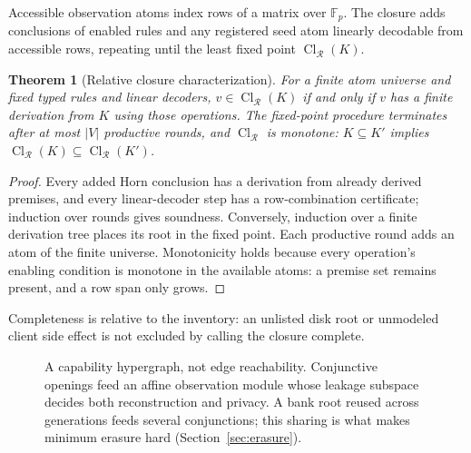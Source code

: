 \documentclass[pdflatex,sn-mathphys-num]{sn-jnl}
\theoremstyle{plain}
\newtheorem{theorem}{Theorem}
\theoremstyle{definition}
\newcommand{\Cl}{\operatorname{Cl}}
\newcommand{\F}{\mathbb{F}}
\begin{document}
Accessible observation atoms index rows of a matrix over $\F_p$. The closure adds conclusions of enabled rules and any registered seed atom linearly decodable from accessible rows, repeating until the least fixed point $\Cl_{\mathcal R}(K)$.

\begin{theorem}[Relative closure characterization]\label{thm:closure}
For a finite atom universe and fixed typed rules and linear decoders, $v\in\Cl_{\mathcal R}(K)$ if and only if $v$ has a finite derivation from $K$ using those operations. The fixed-point procedure terminates after at most $|V|$ productive rounds, and $\Cl_{\mathcal R}$ is monotone: $K\subseteq K'$ implies $\Cl_{\mathcal R}(K)\subseteq\Cl_{\mathcal R}(K')$.
\end{theorem}
\begin{proof}
Every added Horn conclusion has a derivation from already derived premises, and every linear-decoder step has a row-combination certificate; induction over rounds gives soundness. Conversely, induction over a finite derivation tree places its root in the fixed point. Each productive round adds an atom of the finite universe. Monotonicity holds because every operation's enabling condition is monotone in the available atoms: a premise set remains present, and a row span only grows.
\end{proof}

Completeness is relative to the inventory: an unlisted disk root or unmodeled client side effect is not excluded by calling the closure complete.

\begin{figure}[htbp]
\centering
{}
\caption{A capability hypergraph, not edge reachability. Conjunctive openings feed an affine observation module whose leakage subspace decides both reconstruction and privacy. A bank root reused across generations feeds several conjunctions; this sharing is what makes minimum erasure hard (Section~\ref{sec:erasure}).}\label{fig:capabilities}
\end{figure}
\end{document}
